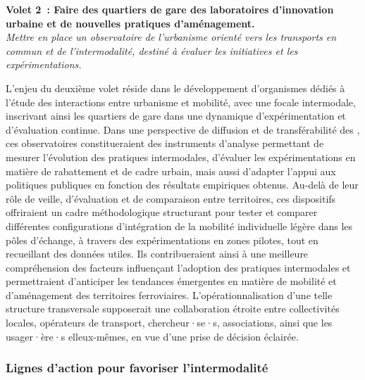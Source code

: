 \begin{refsegment}
    \begin{displayquote}
\textbf{Volet 2~: Faire des quartiers de gare des laboratoires d’innovation urbaine et de nouvelles pratiques d’aménagement.}
\\
\textsl{Mettre en place un observatoire de l'urbanisme orienté vers les transports en commun et de l'intermodalité, destiné à évaluer les initiatives et les expérimentations.}
    \end{displayquote}
L'enjeu du deuxième volet réside dans le développement d'organismes dédiés à l’étude des interactions entre urbanisme et mobilité, avec une focale intermodale, inscrivant ainsi les quartiers de gare dans une dynamique d’expérimentation et d’évaluation continue. Dans une perspective de diffusion et de transférabilité des , ces observatoires constitueraient des instruments d’analyse permettant de mesurer l’évolution des pratiques intermodales, d’évaluer les expérimentations en matière de rabattement et de cadre urbain, mais aussi d’adapter l'appui aux politiques publiques en fonction des résultats empiriques obtenus. Au-delà de leur rôle de veille, d’évaluation et de comparaison entre territoires, ces dispositifs offriraient un cadre méthodologique structurant pour tester et comparer différentes configurations d’intégration de la mobilité individuelle légère dans les pôles d’échange, à travers des expérimentations en zones pilotes, tout en recueillant des données utiles. Ils contribueraient ainsi à une meilleure compréhension des facteurs influençant l’adoption des pratiques intermodales et permettraient d’anticiper les tendances émergentes en matière de mobilité et d’aménagement des territoires ferroviaires. L’opérationnalisation d'une telle structure transversale supposerait une collaboration étroite entre collectivités locales, opérateurs de transport, chercheur·se·s, associations, ainsi que les usager·ère·s elleux-mêmes, en vue d'une prise de décision éclairée.%

\subsubsection*{Lignes d'action pour favoriser l'intermodalité
    \label{conclusion-generale:implications-mobilites}
    }


\end{refsegment}
